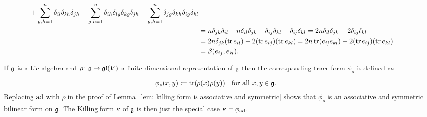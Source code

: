 \begin{expl}
\begin{align*}
     + \sum_{g,h=1}^n \delta_{il} \delta_{kh} \delta_{jh}
     - \sum_{g,h=1}^n \delta_{ih} \delta_{lg} \delta_{kg} \delta_{jh}
     - \sum_{g,h=1}^n\delta_{jg} \delta_{kh}\delta_{ig} \delta_{hl} \\
  &= n \delta_{jk} \delta_{il} + n \delta_{il} \delta_{jk} - \delta_{ij} \delta_{kl} - \delta_{ij} \delta_{kl}
  = 2n \delta_{il} \delta_{jk} - 2 \delta_{ij} \delta_{kl} \\
  &= 2n \delta_{jk} (\operatorname{tr} e_{il})  - 2 (\operatorname{tr} e_{ij})(\operatorname{tr} e_{kl})
  = 2n \operatorname{tr}(e_{ij} e_{kl}) - 2(\operatorname{tr} e_{ij})(\operatorname{tr} e_{kl}) \\
  &= \beta(e_{ij}, e_{kl}).
 \end{align*}
\end{expl}


\begin{rem}\label{rem: associative bilinear form of a representation}
 If $\mathfrak{g}$ is a Lie algebra and $\rho \colon \mathfrak{g} \to \mathfrak{gl}(V)$ a finite dimensional representation of $\mathfrak{g}$ then the corresponding trace form $\phi_\rho$ is defined as
 \[
  \phi_\rho(x,y) \coloneqq \operatorname{tr}(\rho(x) \rho(y)) \quad \text{for all $x,y \in \mathfrak{g}$}.
 \]
 Replacing $\operatorname{ad}$ with $\rho$ in the proof of Lemma~\ref{lem: killing form is associative and symmetric} shows that $\phi_\rho$ is an associative and symmetric bilinear form on $\mathfrak{g}$. The Killing form $\kappa$ of $\mathfrak{g}$ is then just the special case $\kappa = \phi_{\operatorname{ad}}$.
\end{rem}


